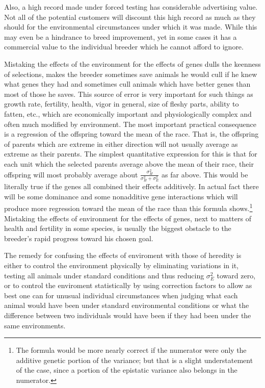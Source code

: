 Also, a high record made under forced testing has considerable
advertising value. Not all of the potential customers will discount this
high record as much as they should for the environmental circumstances
under which it was made. While this may even be a hindrance
to breed improvement, yet in some cases it has a commercial value to
the individual breeder which he cannot afford to ignore.

Mistaking the effects of the environment for the effects of genes dulls
the keenness of selections, makes the breeder sometimes save animals he
would cull if he knew what genes they had and sometimes cull animals
which have better genes than most of those he saves. This source of
error is very important for such things as growth rate, fertility, health,
vigor in general, size of fleshy parts, ability to fatten, etc., which are
economically important and physiologically complex and often much
modified by environment. The most important practical consequence is
a regression of the offspring toward the mean of the race. That is, the
offspring of parents which are extreme in either direction will not
usually average as extreme as their parents. The simplest quantitative
expression for this is that for each unit which the selected parents average
above the mean of their race, their offspring will most probably average
about $\frac{\sigma_H^2}{\sigma_H^2 + \sigma_E^2}$ as far above. This would
be literally true if the genes all combined their effects additively. In
actual fact there will be some dominance and some nonadditive gene
interactions which will produce more regression toward the mean of the
race than this formula shows.\footnote{The formula would be more nearly
correct if the numerator were only the additive genetic portion of the
variance; but that is a slight understatement of the case, since a portion
of the epistatic variance also belongs in the numerator.} Mistaking the
effects of environment for the effects of genes, next to matters of health
and fertility in some species, is usually the biggest obstacle to the
breeder's rapid progress toward his chosen goal.

The remedy for confusing the effects of enviroment with those of
heredity is either to control the environment physically by eliminating
variations in it, testing all animals under standard conditions and thus
reducing $\sigma_E^2$ toward zero, or to control the enviroment
statistically by using correction factors to allow as best
one can for unusual individual circumstances when judging what each animal
would have been under standard environmental conditions or what the
difference between two individuals would have been if they had been under
the same environments.

